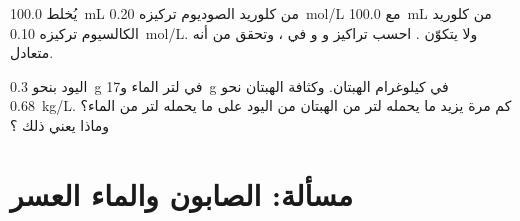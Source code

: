 \begin{exercise}[$\star\star\star$]\label{exo:g11:dissolution:14}
يُخلط \qty{100.0}{mL} من  كلوريد الصوديوم تركيزه \qty{0.20}{mol/L}
مع \qty{100.0}{mL} من  كلوريد الكالسيوم تركيزه
\qty{0.10}{mol/L}. ولا يتكوّن . احسب تراكيز
 و و في ، وتحقق من أنه
متعادل.
\end{exercise}

\begin{exercise}[$\star\star\star$]\label{exo:g11:dissolution:15}
 اليود بنحو \qty{0.3}{g} في لتر الماء
و\qty{17}{g} في كيلوغرام الهبتان. وكثافة الهبتان نحو
\qty{0.68}{kg/L}. كم مرة يزيد ما يحمله لتر من الهبتان من اليود على ما يحمله
لتر من الماء؟ وماذا يعني ذلك ؟
\end{exercise}

\section{مسألة: الصابون والماء العسر}

